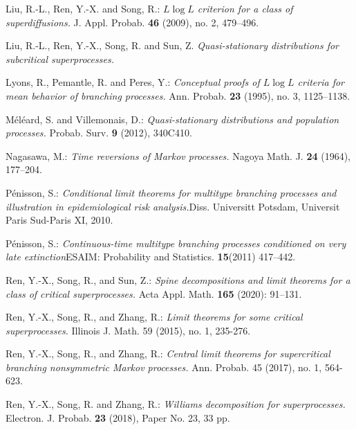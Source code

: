 \documentclass[12pt,a4paper]{amsart}
\numberwithin{equation}{section}
\theoremstyle{plain}
\theoremstyle{definition}
\theoremstyle{remark}
\begin{document}
\begin{thebibliography}{99}
Liu, R.-L., Ren, Y.-X. and Song, R.:
\emph{{$L \log L$} criterion for a class of superdiffusions.}
J. Appl. Probab. \textbf{46} (2009), no. 2, 479--496.

Liu, R.-L., Ren, Y.-X., Song, R. and Sun, Z.
\emph{Quasi-stationary distributions for subcritical superprocesses.}



Lyons, R., Pemantle, R. and Peres, Y.:
\emph{Conceptual proofs of $L\log L$ criteria for mean behavior of branching processes.}
Ann. Probab. \textbf{23} (1995), no. 3, 1125--1138.

M\'el\'eard, S. and Villemonais, D.:
\emph{Quasi-stationary distributions and population processes.}
Probab. Surv. \textbf{9} (2012), 340C410.

Nagasawa, M.:
\emph{Time reversions of Markov processes.}
Nagoya Math. J. \textbf{24} (1964), 177--204.

P\'enisson, S.:
\emph{Conditional limit theorems for multitype branching processes and illustration in epidemiological risk analysis.}Diss. Universitt Potsdam, Universit Paris Sud-Paris XI, 2010.

P\'enisson, S.:
\emph{Continuous-time multitype branching processes conditioned on very late extinction}ESAIM: Probability and Statistics. \textbf{15}(2011) 417--442.

	Ren, Y.-X., Song, R., and Sun, Z.:
	\emph{Spine decompositions and limit theorems for a class of critical superprocesses.}
	Acta Appl. Math. \textbf{165} (2020): 91--131.

Ren, Y.-X., Song, R., and Zhang, R.:
\emph{Limit theorems for some critical superprocesses.}
Illinois J. Math. 59 (2015), no. 1, 235-276.

Ren, Y.-X., Song, R., and Zhang, R.:
\emph{Central limit theorems for supercritical branching nonsymmetric Markov processes.}
Ann. Probab. 45 (2017), no. 1, 564-623.

Ren, Y.-X., Song, R. and Zhang, R.:
\emph{Williams decomposition for superprocesses.}
Electron. J. Probab. \textbf{23} (2018), Paper No. 23, 33 pp.


\end{thebibliography}
\end{document}
